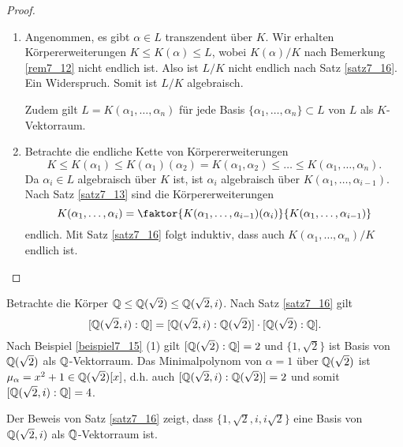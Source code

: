 \begin{proof}
	\begin{enumerate}[label=(\alph*)]
		\item Angenommen, es gibt $\alpha \in L$ transzendent über $K$. Wir erhalten Körpererweiterungen $K \leq K(\alpha) \leq L$, wobei $K(\alpha)/K$ nach Bemerkung \ref{rem7_12} nicht endlich ist. Also ist $L/K$ nicht endlich nach Satz \ref{satz7_16}. Ein Widerspruch. Somit ist $L/K$ algebraisch.
		
		Zudem gilt $L = K(\alpha_1, \dots, \alpha_n)$ für jede Basis $\{\alpha_1, \dots, \alpha_n\} \subset L$ von $L$ als $K$-Vektorraum.
		
		\item Betrachte die endliche Kette von Körpererweiterungen
		\[K \leq K(\alpha_1) \leq K(\alpha_1)(\alpha_2) = K(\alpha_1, \alpha_2) \leq \dots \leq K(\alpha_1, \dots, \alpha_n).\]
		Da $\alpha_i \in L$ algebraisch über $K$ ist, ist $\alpha_i$ algebraisch über $K(\alpha_1, \dots, \alpha_{i-1})$. Nach Satz \ref{satz7_13} sind die Körpererweiterungen 
		\[K(\alpha_1, \dots, \alpha_i) = \faktor{K(\alpha_1, \dots, a_{i-1})(\alpha_i)}{K(\alpha_1, \dots, \alpha_{i-1})} \]
		endlich. Mit Satz \ref{satz7_16} folgt induktiv, dass auch $K(\alpha_1, \dots, \alpha_n)/K$ endlich ist.
	\end{enumerate}
\end{proof}
\begin{beispiel}\label{beispiel7_18}
	Betrachte die Körper $\mathbb{Q} \leq \mathbb{Q}(\sqrt{2}) \leq \mathbb{Q}(\sqrt{2}, i)$. Nach Satz \ref{satz7_16} gilt
	\[[\mathbb{Q}(\sqrt{2},i) : \mathbb{Q}] = [\mathbb{Q}(\sqrt{2}, i) : \mathbb{Q}(\sqrt{2})] \cdot [\mathbb{Q}(\sqrt{2}) : \mathbb{Q}].\]
	Nach Beispiel \ref{beispiel7_15} (1) gilt $[\mathbb{Q}(\sqrt{2}) : \mathbb{Q}] = 2$ und $\{1, \sqrt{2}\}$ ist Basis von $\mathbb{Q}(\sqrt{2})$ als $\mathbb{Q}$-Vektorraum.
	Das Minimalpolynom von $\alpha = 1$ über $\mathbb{Q}(\sqrt{2})$ ist $\mu_\alpha = x^2 + 1 \in \mathbb{Q}(\sqrt{2})[x]$, d.h. auch $[\mathbb{Q}(\sqrt{2}, i) : \mathbb{Q}(\sqrt{2})] = 2$ und somit $[\mathbb{Q}(\sqrt{2}, i) : \mathbb{Q}] = 4$.
	
	Der Beweis von Satz \ref{satz7_16} zeigt, dass $\{1, \sqrt{2}, i, i \sqrt{2}\}$ eine Basis von $\mathbb{Q}(\sqrt{2}, i)$ als $\mathbb{Q}$-Vektorraum ist.
\end{beispiel}

